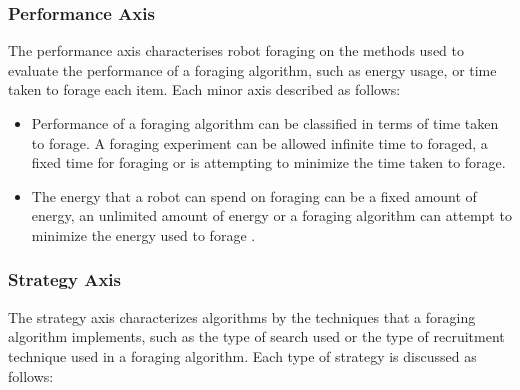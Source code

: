 \subsubsection{Performance Axis}
The performance axis characterises robot foraging on the methods used to evaluate the performance of a foraging algorithm, such as energy usage, or time taken to forage each item. Each minor axis described as follows:

\begin{itemize}
\item Performance of a foraging algorithm can be classified in terms of time taken to forage. A foraging experiment can be allowed infinite time to foraged, a fixed time for foraging or is attempting to minimize the time taken to forage.
\item The energy that a robot can spend on foraging can be a fixed amount of energy, an unlimited amount of energy or a foraging algorithm can attempt to minimize the energy used to forage \cite{liu2006strategies}.
\end{itemize}

\subsubsection{Strategy Axis}
The strategy axis characterizes algorithms by the techniques that a foraging algorithm implements, such as the type of search used or the type of recruitment technique used in a foraging algorithm. Each type of strategy is discussed as follows:


